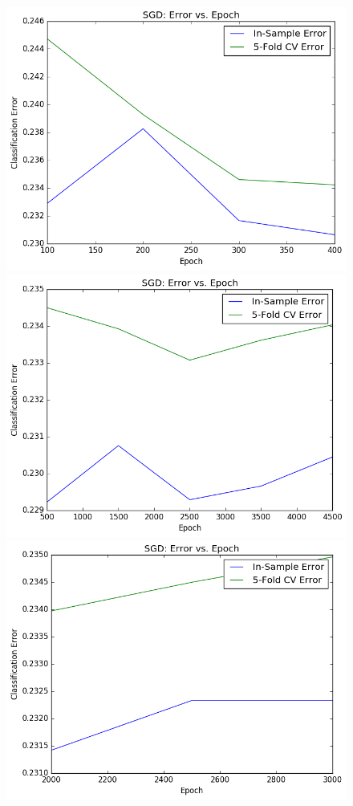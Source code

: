 \begin{itemize}
\begin{itemize}
\begin{figure}[H]
\centering
\includegraphics[scale=0.25]{sgd-vs-epoch2}
\includegraphics[scale=0.25]{sgd-vs-epoch3}
\includegraphics[scale=0.25]{sgd-vs-epoch4}

\end{figure}
\end{itemize}
\end{itemize}
